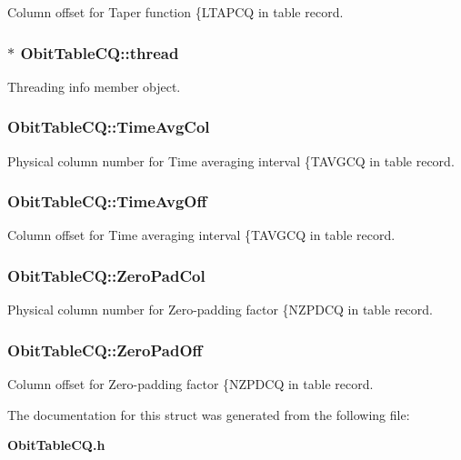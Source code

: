 Column offset for Taper function \{LTAPCQ in table record. 

\subsubsection{$\ast$ {\bf Obit\-Table\-CQ::thread}}\label{structObitTableCQ_o4}


Threading info member object. 

\subsubsection{ {\bf Obit\-Table\-CQ::Time\-Avg\-Col}}\label{structObitTableCQ_o40}


Physical column number for Time averaging interval \{TAVGCQ in table record. 

\subsubsection{ {\bf Obit\-Table\-CQ::Time\-Avg\-Off}}\label{structObitTableCQ_o39}


Column offset for Time averaging interval \{TAVGCQ in table record. 

\subsubsection{ {\bf Obit\-Table\-CQ::Zero\-Pad\-Col}}\label{structObitTableCQ_o36}


Physical column number for Zero-padding factor \{NZPDCQ in table record. 

\subsubsection{ {\bf Obit\-Table\-CQ::Zero\-Pad\-Off}}\label{structObitTableCQ_o35}


Column offset for Zero-padding factor \{NZPDCQ in table record. 



The documentation for this struct was generated from the following file:\begin{CompactItemize}
\item 
{\bf Obit\-Table\-CQ.h}\end{CompactItemize}
